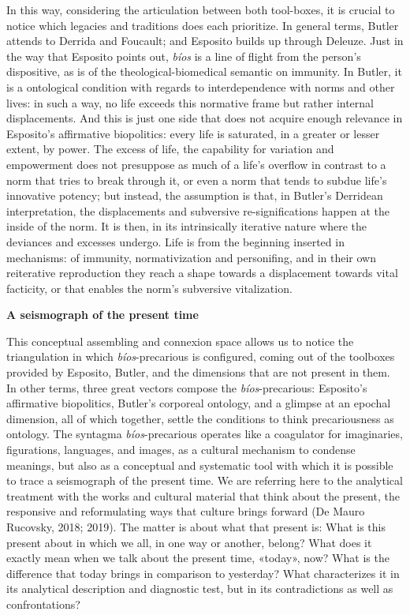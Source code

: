 \documentclass[a4paper,]{scrartcl}
\begin{document}
In this way, considering the articulation between both tool-boxes, it is
crucial to notice which legacies and traditions does each prioritize. In
general terms, Butler attends to Derrida and Foucault; and Esposito
builds up through Deleuze. Just in the way that Esposito points out,
\emph{bíos} is a line of flight from the person's dispositive, as is of
the theological-biomedical semantic on immunity. In Butler, it is a
ontological condition with regards to interdependence with norms and
other lives: in such a way, no life exceeds this normative frame but
rather internal displacements. And this is just one side that does not
acquire enough relevance in Esposito's affirmative biopolitics: every
life is saturated, in a greater or lesser extent, by power. The excess
of life, the capability for variation and empowerment does not
presuppose as much of a life's overflow in contrast to a norm that tries
to break through it, or even a norm that tends to subdue life's
innovative potency; but instead, the assumption is that, in Butler's
Derridean interpretation, the displacements and subversive
re-significations happen at the inside of the norm. It is then, in its
intrinsically iterative nature where the deviances and excesses undergo.
Life is from the beginning inserted in mechanisms: of immunity,
normativization and personifing, and in their own reiterative
reproduction they reach a shape towards a displacement towards vital
facticity, or that enables the norm's subversive vitalization.

\textbf{A seismograph of the present time}

This conceptual assembling and connexion space allows us to notice the
triangulation in which \emph{bíos}-precarious is configured, coming out
of the toolboxes provided by Esposito, Butler, and the dimensions that
are not present in them. In other terms, three great vectors compose the
\emph{bíos}-precarious: Esposito's affirmative biopolitics, Butler's
corporeal ontology, and a glimpse at an epochal dimension, all of which
together, settle the conditions to think precariousness as ontology. The
syntagma \emph{bíos}-precarious operates like a coagulator for
imaginaries, figurations, languages, and images, as a cultural mechanism
to condense meanings, but also as a conceptual and systematic tool with
which it is possible to trace a seismograph of the present time. We are
referring here to the analytical treatment with the works and cultural
material that think about the present, the responsive and reformulating
ways that culture brings forward (De Mauro Rucovsky, 2018; 2019). The
matter is about what that present is: What is this present about in
which we all, in one way or another, belong? What does it exactly mean
when we talk about the present time, «today», now? What is the
difference that today brings in comparison to yesterday? What
characterizes it in its analytical description and diagnostic test, but
in its contradictions as well as confrontations?
\end{document}
